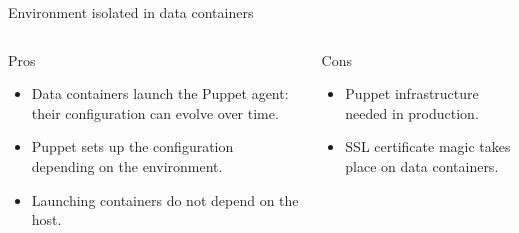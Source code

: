 \documentclass[presentation,c]{beamer}
\begin{document}
{
\begin{frame}[label=sec-13-6]{Environment isolated in data containers}

\begin{columns}
\begin{column}{0.5\textwidth}
\begin{block}{Pros}

\begin{itemize}
\item Data containers launch the Puppet agent: their configuration can evolve over time.
\item Puppet sets up the configuration depending on the environment.
\item Launching containers do not depend on the host.
\end{itemize}
\end{block}
\end{column}

\begin{column}{0.5\textwidth}
\begin{block}{Cons}

\begin{itemize}
\item Puppet infrastructure needed in production.
\item SSL certificate magic takes place on data containers.
\end{itemize}
\end{block}
\end{column}
\end{columns}
\end{frame}
} %

\section{}
\label{sec-14}
{
\begin{frame}[label=sec-14-1]{}
\end{frame}
} %
\end{document}
